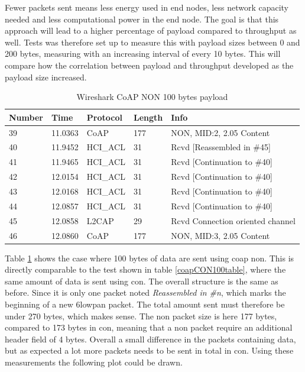 \noindent Fewer packets sent means less energy used in end nodes, less network capacity needed and less computational power in the end node. The goal is that this approach will lead to a higher percentage of \gls{payload} compared to throughput as well. Tests was therefore set up to measure this with \gls{payload} sizes between 0 and 200 bytes, measuring with an increasing interval of every 10 bytes. This will compare how the correlation between \gls{payload} and \gls{throughput} developed as the \gls{payload} size increased.

\begin{table}[H]
\small
\centering
\caption{Wireshark CoAP NON 100 bytes payload}
\label{coapNON100table}
\begin{tabular}{lllll}
\hline
Number & Time    & Protocol & Length & Info   							  \\ \hline                          
39     & 11.0363 & CoAP     & 177    & NON, MID:2, 2.05 Content         \\
40     & 11.9452 & HCI\_ACL & 31     & Rcvd {[}Reassembled in \#45{]}   \\
41     & 11.9465 & HCI\_ACL & 31     & Rcvd {[}Continuation to \#40{]}  \\
42     & 12.0154 & HCI\_ACL & 31     & Rcvd {[}Continuation to \#40{]}  \\
43     & 12.0168 & HCI\_ACL & 31     & Rcvd {[}Continuation to \#40{]}  \\
44     & 12.0857 & HCI\_ACL & 31     & Rcvd {[}Continuation to \#40{]}  \\
45     & 12.0858 & L2CAP    & 29     & Rcvd Connection oriented channel \\
46     & 12.0860 & CoAP     & 177    & NON, MID:3, 2.05 Content         \\ \hline
\end{tabular}
\end{table}

\noindent Table \ref{coapNON100table} shows the case where 100 bytes of data are sent using \gls{coap} \gls{non}. This is directly comparable to the test shown in table \ref{coapCON100table}, where the same amount of data is sent using \gls{con}. The overall structure is the same as before. Since it is only one packet noted \textit{Reassembled in \#n}, which marks the beginning of a new \gls{6lowpan} packet. The total amount sent must therefore be under 270 bytes, which makes sense. The \gls{non} packet size is here 177 bytes, compared to 173 bytes in \gls{con}, meaning that a \gls{non} packet require an additional header field of 4 bytes. Overall a small difference in the packets containing data, but as expected a lot more packets needs to be sent in total in \gls{con}. Using these measurements the following plot could be drawn. 

